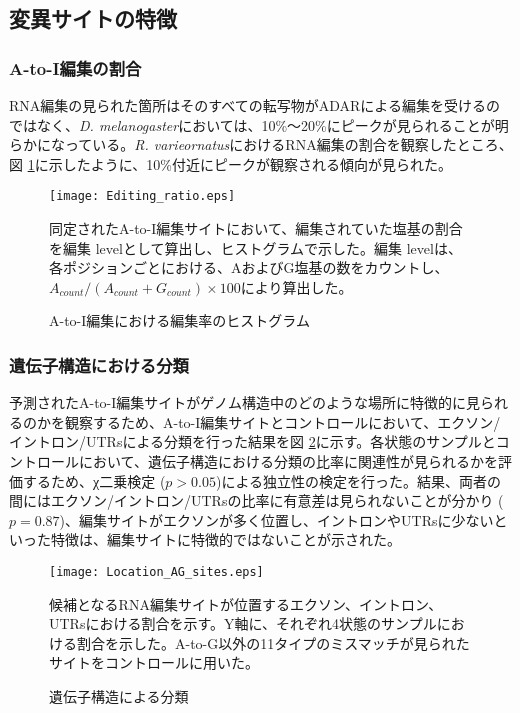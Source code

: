 \subsection{変異サイトの特徴}
\subsubsection{A-to-I編集の割合}
RNA編集の見られた箇所はそのすべての転写物がADARによる編集を受けるのではなく、{\it D. melanogaster}においては、10\%〜20\%にピークが見られることが明らかになっている。{\it R. varieornatus}におけるRNA編集の割合を観察したところ、図 \ref{fig:freq}に示したように、10\%付近にピークが観察される傾向が見られた。

\begin{figure}[!h]
	\centering
	\texttt{[image: Editing\_ratio.eps]}
	\caption{A-to-I編集における編集率のヒストグラム}
	\begin{flushleft}
		\small{同定されたA-to-I編集サイトにおいて、編集されていた塩基の割合を編集 levelとして算出し、ヒストグラムで示した。編集 levelは、各ポジションごとにおける、AおよびG塩基の数をカウントし、$A_{count}/(A_{count}+G_{count}) \times100$により算出した。}
	\end{flushleft}
	\label{fig:freq}
\end{figure}

\subsubsection{遺伝子構造における分類}
予測されたA-to-I編集サイトがゲノム構造中のどのような場所に特徴的に見られるのかを観察するため、A-to-I編集サイトとコントロールにおいて、エクソン/イントロン/UTRsによる分類を行った結果を図 \ref{fig:location}に示す。各状態のサンプルとコントロールにおいて、遺伝子構造における分類の比率に関連性が見られるかを評価するため、χ二乗検定 ($p>0.05$)による独立性の検定を行った。結果、両者の間にはエクソン/イントロン/UTRsの比率に有意差は見られないことが分かり ($p=0.87$)、編集サイトがエクソンが多く位置し、イントロンやUTRsに少ないといった特徴は、編集サイトに特徴的ではないことが示された。
			
\begin{figure}[!h]
	\centering
	\texttt{[image: Location\_AG\_sites.eps]}
	\caption{遺伝子構造による分類}
	\begin{flushleft}
		\small{候補となるRNA編集サイトが位置するエクソン、イントロン、UTRsにおける割合を示す。Y軸に、それぞれ4状態のサンプルにおける割合を示した。A-to-G以外の11タイプのミスマッチが見られたサイトをコントロールに用いた。}
	\end{flushleft}
	\label{fig:location}
\end{figure}

